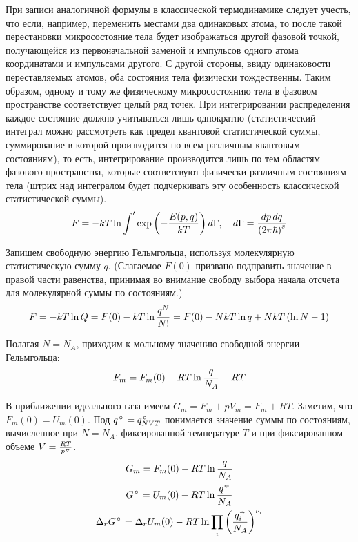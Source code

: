 При записи аналогичной формулы в классической термодинамике следует учесть, что если, например, переменить местами два одинаковых атома, то после такой перестановки микросостояние тела будет изображаться другой фазовой точкой, получающейся из первоначальной заменой и импульсов одного атома координатами и импульсами другого. С другой стороны, ввиду одинаковости переставляемых атомов, оба состояния тела физически тождественны. Таким образом, одному и тому же физическому микросостоянию тела в фазовом пространстве соответствует целый ряд точек. При интегрировании распределения каждое состояние должно учитываться лишь однократно (статистический интеграл можно рассмотреть как предел квантовой статистической суммы, суммирование в которой производится по всем различным квантовым состояниям), то есть, интегрирование производится лишь по тем областям фазового пространства, которые соответсвуют физически различным состояниям тела (штрих над интегралом будет подчеркивать эту особенность классической статистической суммы).
\vverh
\begin{gather}
	F = -k T \ln \int^{\prime} \exp \left( - \frac{E(p, q)}{kT} \right) d \Gamma, \quad d \Gamma = \frac{dp \, dq}{\left( 2 \pi \hbar \right)^s} \notag
\end{gather}

Запишем свободную энергию Гельмгольца, используя молекулярную статистическую сумму $q$. (Слагаемое $F(0)$ призвано подправить значение в правой части равенства, принимая во внимание свободу выбора начала отсчета для молекулярной суммы по состояниям.)  
\vverh
\begin{gather}
	F = - k T \ln Q = F(0) - kT \ln \frac{q^N}{N!} = F(0) - NkT \ln q + NkT \left( \ln N - 1 \right) \notag 
\end{gather}

Полагая $N = N_A$, приходим к мольному значению свободной энергии Гельмгольца:
\vverh
\begin{gather}
	F_m = F_m(0) - RT \ln \frac{q}{N_A} - RT \notag
\end{gather}

В приближении идеального газа имеем $G_m = F_m + p V_m = F_m + RT$. Заметим, что $F_m(0) = U_m(0)$. Под $q^{\barcirc} = q_{NVT}^{\barcirc}$ понимается значение суммы по состояниям, вычисленное при $N = N_A$, фиксированной температуре $T$ и при фиксированном объеме $V = \frac{RT}{p^{\barcirc}}$.
\vverh
\begin{gather} 
	G_m = F_m(0) - RT \ln \frac{q}{N_A} \notag \\
	G^{\barcirc} = U_m(0) - RT \ln \frac{q^{\barcirc}}{N_A} \notag \\
	\Delta_r G^{\barcirc} = \Delta_r U_m(0) - RT \ln \prod_{i} \lb \frac{q_i^{\barcirc}}{N_A} \rb ^{\nu_i} \notag
\end{gather}

